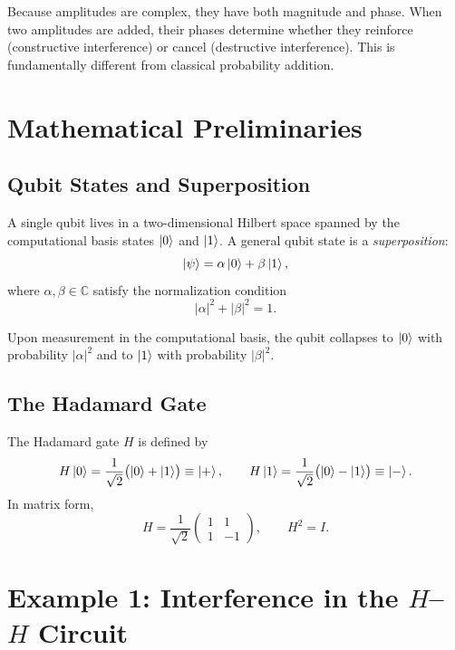 \documentclass[a4paper,11pt]{article}
\providecommand{\ket}[1]{\mathinner{|{#1}\rangle}}
\begin{document}
Because amplitudes are complex, they have both magnitude and phase. When two amplitudes are
added, their phases determine whether they reinforce (constructive interference) or cancel
(destructive interference). This is fundamentally different from classical probability addition.

\section*{Mathematical Preliminaries}

\subsection*{Qubit States and Superposition}

A single qubit lives in a two-dimensional Hilbert space spanned by the computational basis states
$\ket{0}$ and $\ket{1}$. A general qubit state is a \emph{superposition}:
\begin{equation}
  \ket{\psi} = \alpha\ket{0} + \beta\ket{1},
\end{equation}
where $\alpha, \beta \in \mathbb{C}$ satisfy the normalization condition
\begin{equation}
  |\alpha|^2 + |\beta|^2 = 1.
\end{equation}

Upon measurement in the computational basis, the qubit collapses to $\ket{0}$ with probability
$|\alpha|^2$ and to $\ket{1}$ with probability $|\beta|^2$.

\subsection*{The Hadamard Gate}

The Hadamard gate $H$ is defined by
\begin{equation}
  H\ket{0} = \frac{1}{\sqrt{2}}\bigl(\ket{0} + \ket{1}\bigr) \equiv \ket{+},
  \qquad
  H\ket{1} = \frac{1}{\sqrt{2}}\bigl(\ket{0} - \ket{1}\bigr) \equiv \ket{-}.
\end{equation}
In matrix form,
\begin{equation}
  H = \frac{1}{\sqrt{2}}
  \begin{pmatrix}
    1 & 1 \\
    1 & -1
  \end{pmatrix},
  \qquad H^2 = I.
\end{equation}

\section*{Example 1: Interference in the $H$--$H$ Circuit}
\end{document}

